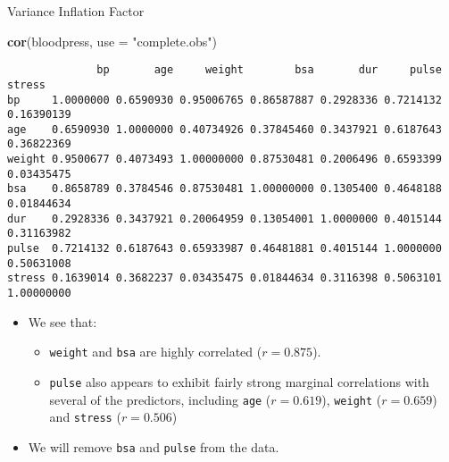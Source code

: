 \documentclass[
  ignorenonframetext,
]{beamer}
\newenvironment{Shaded}{\begin{snugshade}}{\end{snugshade}}
\newcommand{\AttributeTok}[1]{\textcolor[rgb]{0.13,0.29,0.53}{#1}}
\newcommand{\FunctionTok}[1]{\textcolor[rgb]{0.13,0.29,0.53}{\textbf{#1}}}
\newcommand{\NormalTok}[1]{#1}
\newcommand{\StringTok}[1]{\textcolor[rgb]{0.31,0.60,0.02}{#1}}
\providecommand{\tightlist}{%
  \setlength{\itemsep}{0pt}\setlength{\parskip}{0pt}}
\begin{document}
\begin{frame}[fragile]{Variance Inflation Factor}
\protect\hypertarget{variance-inflation-factor-3}{}
\tiny

\begin{Shaded}
\begin{Highlighting}[]
\FunctionTok{cor}\NormalTok{(bloodpress, }\AttributeTok{use =} \StringTok{"complete.obs"}\NormalTok{)}
\end{Highlighting}
\end{Shaded}

\begin{verbatim}
              bp       age     weight        bsa       dur     pulse     stress
bp     1.0000000 0.6590930 0.95006765 0.86587887 0.2928336 0.7214132 0.16390139
age    0.6590930 1.0000000 0.40734926 0.37845460 0.3437921 0.6187643 0.36822369
weight 0.9500677 0.4073493 1.00000000 0.87530481 0.2006496 0.6593399 0.03435475
bsa    0.8658789 0.3784546 0.87530481 1.00000000 0.1305400 0.4648188 0.01844634
dur    0.2928336 0.3437921 0.20064959 0.13054001 1.0000000 0.4015144 0.31163982
pulse  0.7214132 0.6187643 0.65933987 0.46481881 0.4015144 1.0000000 0.50631008
stress 0.1639014 0.3682237 0.03435475 0.01844634 0.3116398 0.5063101 1.00000000
\end{verbatim}

\normalsize

\begin{itemize}
\item
  We see that:

  \begin{itemize}
  \tightlist
  \item
    \texttt{weight} and \texttt{bsa} are highly correlated
    (\(r= 0.875\)).
  \item
    \texttt{pulse} also appears to exhibit fairly strong marginal
    correlations with several of the predictors, including \texttt{age}
    (\(r = 0.619\)), \texttt{weight} (\(r = 0.659\)) and \texttt{stress}
    (\(r = 0.506\))
  \end{itemize}
\item
  We will remove \texttt{bsa} and \texttt{pulse} from the data.
\end{itemize}
\end{frame}
\end{document}
